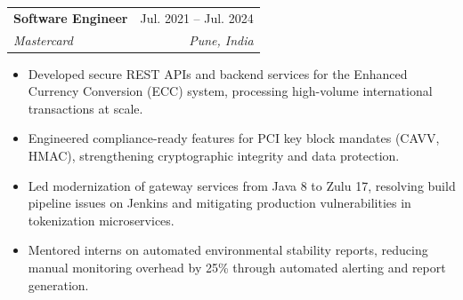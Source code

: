 \documentclass[letterpaper,11pt]{article}
\makeatletter
\newcommand{\resumeItem}[1]{
  \item\small{
    {#1 \vspace{-2pt}}
  }
}
\newcommand{\resumeSubheading}[4]{
  \vspace{-2pt}\item
    \begin{tabular*}{0.97\textwidth}[t]{l@{\extracolsep{\fill}}r}
      \textbf{#1} & #2 \\
      \textit{\small#3} & \textit{\small #4} \\
    \end{tabular*}\vspace{-7pt}
}
\newcommand{\resumeItemListStart}{\begin{itemize}[noitemsep, topsep=0pt, parsep=0pt]}
\newcommand{\resumeItemListEnd}{\end{itemize}\vspace{-5pt}}
\makeatother
\begin{document}
  \resumeSubheading
    {Software Engineer}{Jul. 2021 -- Jul. 2024}
    {Mastercard}{Pune, India}
    \resumeItemListStart
      \resumeItem{Developed secure REST APIs and backend services for the Enhanced Currency Conversion (ECC) system, processing high-volume international transactions at scale.}
      \resumeItem{Engineered compliance-ready features for PCI key block mandates (CAVV, HMAC), strengthening cryptographic integrity and data protection.}
      \resumeItem{Led modernization of gateway services from Java 8 to Zulu 17, resolving build pipeline issues on Jenkins and mitigating production vulnerabilities in tokenization microservices.}
      \resumeItem{Mentored interns on automated environmental stability reports, reducing manual monitoring overhead by 25\% through automated alerting and report generation.}
    \resumeItemListEnd



\end{document}
